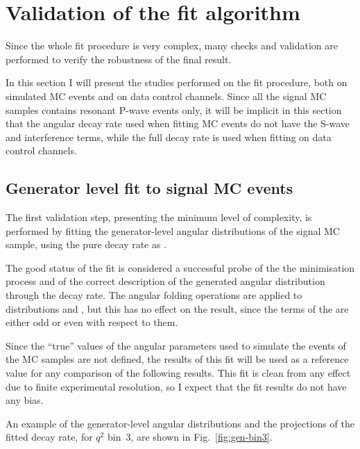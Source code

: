 \section{Validation of the fit algorithm}
\label{sec:validation}

Since the whole fit procedure is very complex, many checks and validation are performed to verify the robustness of the final result.

In this section I will present the studies performed on the fit procedure, both on simulated MC events and on data control channels.
Since all the signal MC samples contains resonant P-wave events only, it will be implicit in this section that the angular decay rate used when fitting MC events do not have the S-wave and interference terms, while the full decay rate is used when fitting on data control channels.

\subsection{Generator level fit to signal MC events}
\label{sec:fitval-gen}

The first validation step, presenting the minimum level of complexity, is performed by fitting the generator-level angular distributions of the signal MC sample, using the pure decay rate as \pdf.

The good status of the fit is considered a successful probe of the the minimisation process and of the correct description of the generated angular distribution through the decay rate.
The angular folding operations are applied to distributions and \pdfs, but this has no effect on the result, since the terms of the \pdf are either odd or even with respect to them.

Since the ``true'' values of the angular parameters used to simulate the events of the MC samples are not defined, the results of this fit will be used as a reference value for any comparison of the following results.
This fit is clean from any effect due to finite experimental resolution, so I expect that the fit results do not have any bias.

An example of the generator-level angular distributions and the projections of the fitted decay rate, for $q^2$ bin~3, are shown in Fig.~\ref{fig:gen-bin3}.



